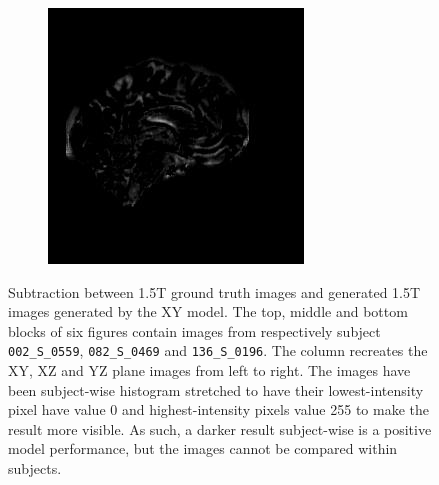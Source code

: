 \documentclass[11pt, fleqn, titlepage]{article}
\newcommand\skipperer{0.45pt}
\newcommand{\1}[1]{\mathds{1}\left[#1\right]}
\begin{document}
\begin{figure}[H]
\begin{subfigure}[b]{0.8\textwidth}
		\hskip\skipperer
		\includegraphics[width=0.22\linewidth]{imgs/subtracted_images/xy/136_S_0196_yz_1.5_1.5gen_comparison}
	\end{subfigure}
	\caption{Subtraction between 1.5T ground truth images and generated 1.5T images generated by the XY model. The top, middle and bottom blocks of six figures contain images from respectively subject \texttt{002\_S\_0559}, \texttt{082\_S\_0469} and \texttt{136\_S\_0196}. The column recreates the XY, XZ and YZ plane images from left to right. The images have been subject-wise histogram stretched to have their lowest-intensity pixel have value 0 and highest-intensity pixels value 255 to make the result more visible. As such, a darker result subject-wise is a positive model performance, but the images cannot be compared within subjects.}
	\label{fig:xy_subtracted_images}
\end{figure}
\end{document}
